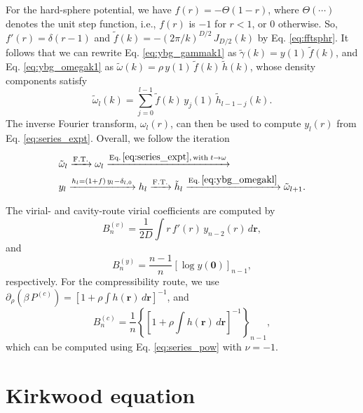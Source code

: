 \documentclass[aip,jcp,preprint,superscriptaddress,showpacs,preprintnumbers,amsmath,amssymb]{revtex4-1}
\numberwithin{equation}{section}
\newcommand{\vct}[1]{\mathbf{#1}}
\providecommand{\vr}{} %
\renewcommand{\vr}{\vct{r}}
\begin{document}
For the hard-sphere potential,
we have
$f(r) = -\Theta(1 - r)$,
where $\Theta(\cdots)$ denotes the unit step function,
i.e., $f(r)$ is $-1$ for $r < 1$, or $0$ otherwise.
%
So,
$f'(r) = \delta(r - 1)$
and
$\tilde f(k) = -(2\pi/k)^{D/2} \, J_{D/2}(k)$
by Eq. \eqref{eq:fftsphr}.
%
It follows that
we can rewrite Eq. \eqref{eq:ybg_gammak1} as
$\tilde \gamma(k) = y(1) \, \tilde f(k)$,
and
Eq. \eqref{eq:ybg_omegak1} as
$\tilde \omega(k) = \rho \, y(1) \, \tilde f(k) \, \tilde h(k)$,
whose density components satisfy
%
%
%
\begin{equation}
\tilde \omega_l(k)
=
\sum_{j = 0}^{l - 1}
\tilde f(k) \, y_j(1) \, \tilde h_{l-1-j}(k).
\label{eq:ybg_omegakl}
\end{equation}
%
%
%
The inverse Fourier transform, $\omega_l(r)$,
can then be used to compute $y_l(r)$ from Eq. \eqref{eq:series_expt}.
%
Overall, we follow the iteration
%
\begin{align*}
&
\tilde \omega_l
  \xrightarrow{ \mathrm{F.T.} }
\omega_l
  \xrightarrow{ \mathrm{Eq.\,\eqref{eq:series_expt},\,with\;} t \rightarrow \omega }
\\
&
y_l
\xrightarrow{ h_l = (1 + f) \, y_l - \delta_{l,0} }
h_l
  \xrightarrow{ \mathrm{F.T.} }
\tilde h_l
  \xrightarrow{ \mathrm{Eq.\,\eqref{eq:ybg_omegakl} } }
\tilde \omega_{l + 1}.
\end{align*}



The virial- and cavity-route virial coefficients are computed by
%
%
%
\begin{equation}
B_n^{(v)}
=
\frac{ 1 } { 2 D }
\int
  r \, f'(r) \, y_{n - 2}(r) \, d\vr,
\label{eq:Bn_virial}
\end{equation}
%
%
%
and
%
%
%
\begin{equation}
B_n^{(y)}
=
\frac{ n - 1 } { n }
\left[
  \log y(\vct 0)
\right]_{n - 1},
\label{eq:Bn_cavity}
\end{equation}
%
%
%
respectively.
%
For the compressibility route,
we use
$\partial_\rho
\left(
  \beta \, P^{(c)}
\right)
=
\left[
  1 + \rho \int h(\vr) \, d\vr
\right]^{-1}$,
%
and
%
\begin{equation}
B_n^{(c)}
=
\frac{ 1 } { n }
\left\{
  \left[
    1 + \rho \int h(\vr) \, d\vr
  \right]^{-1}
\right\}_{n - 1},
\label{eq:Bn_compressibility}
\end{equation}
%
which can be computed using Eq. \eqref{eq:series_pow}
with $\nu = -1$.





\section{\label{sec:kirkwood}Kirkwood equation}
\end{document}
